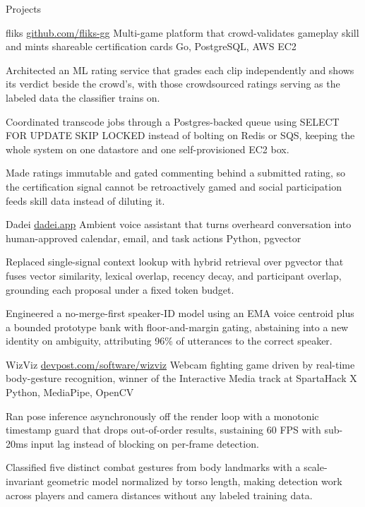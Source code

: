 \documentclass[
	11pt
]{../../../template}
\begin{document}
	\begin{rSection}{P}{rojects}
		\begin{rSectionEntry}
			{fliks}
			{\href{https://github.com/fliks-gg}{github.com/fliks-gg}}
			{Multi-game platform that crowd-validates gameplay skill and mints shareable certification cards}
			{Go, PostgreSQL, AWS EC2}
			{}

			\item Architected an ML rating service that grades each clip independently and shows its verdict beside the crowd's, with those crowdsourced ratings serving as the labeled data the classifier trains on.
			\item Coordinated transcode jobs through a Postgres-backed queue using SELECT FOR UPDATE SKIP LOCKED instead of bolting on Redis or SQS, keeping the whole system on one datastore and one self-provisioned EC2 box.
			\item Made ratings immutable and gated commenting behind a submitted rating, so the certification signal cannot be retroactively gamed and social participation feeds skill data instead of diluting it.
		\end{rSectionEntry}

		\begin{rSectionEntry}
			{Dadei}
			{\href{https://dadei.app}{dadei.app}}
			{Ambient voice assistant that turns overheard conversation into human-approved calendar, email, and task actions}
			{Python, pgvector}
			{}

			\item Replaced single-signal context lookup with hybrid retrieval over pgvector that fuses vector similarity, lexical overlap, recency decay, and participant overlap, grounding each proposal under a fixed token budget.
			\item Engineered a no-merge-first speaker-ID model using an EMA voice centroid plus a bounded prototype bank with floor-and-margin gating, abstaining into a new identity on ambiguity, attributing 96\% of utterances to the correct speaker.
		\end{rSectionEntry}

		\begin{rSectionEntry}
			{WizViz}
			{\href{https://devpost.com/software/wizviz}{devpost.com/software/wizviz}}
			{Webcam fighting game driven by real-time body-gesture recognition, winner of the Interactive Media track at SpartaHack X}
			{Python, MediaPipe, OpenCV}
			{}

			\item Ran pose inference asynchronously off the render loop with a monotonic timestamp guard that drops out-of-order results, sustaining 60 FPS with sub-20ms input lag instead of blocking on per-frame detection.
			\item Classified five distinct combat gestures from body landmarks with a scale-invariant geometric model normalized by torso length, making detection work across players and camera distances without any labeled training data.
		\end{rSectionEntry}
	\end{rSection}
\end{document}
